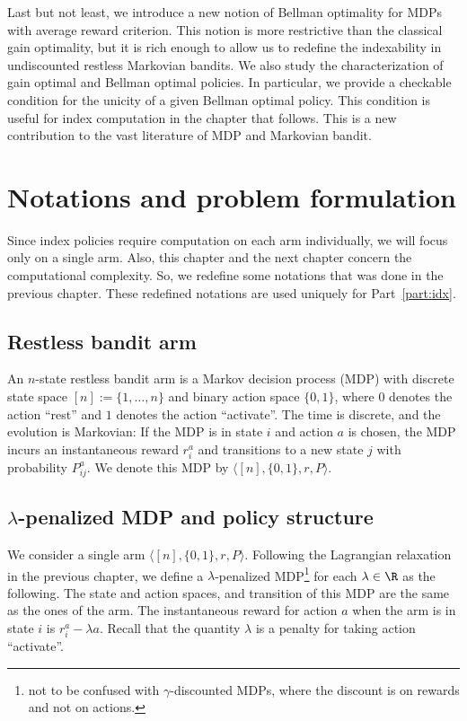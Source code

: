 Last but not least, we introduce a new notion of Bellman optimality for MDPs with average reward criterion. This notion is more restrictive than the classical gain optimality, but it is rich enough to allow us to redefine the indexability in undiscounted restless Markovian bandits. We also study the characterization of gain optimal and Bellman optimal policies. In particular, we provide a checkable condition for the unicity of a given Bellman optimal policy.
This condition is useful for index computation in the chapter that follows.
This is a new contribution to the vast literature of MDP and Markovian bandit.

\section{Notations and problem formulation}
\label{ch:idx:sec:notation}

Since index policies require computation on each arm individually, we will focus only on a single arm.
Also, this chapter and the next chapter concern the computational complexity.
So, we redefine some notations that was done in the previous chapter.
These redefined notations are used uniquely for Part~\ref{part:idx}.

\subsection{Restless bandit arm}

An $n$-state restless bandit arm is a Markov decision process (MDP) with discrete state space $[n]:=\{1,\dots, n\}$ and binary action space $\{0, 1\}$, where $0$ denotes the action ``rest'' and $1$ denotes the action ``activate''. The time is discrete, and the evolution is Markovian: If the MDP is in state $i$ and action $a$ is chosen, the MDP incurs an instantaneous reward ${r}^a_i$ and transitions to a new state $j$ with probability ${P}^a_{ij}$. We denote this MDP by $\langle[n],\{0,1\},r,P\rangle$.

\subsection{\texorpdfstring{$\lambda$-p}{P}enalized MDP and policy structure}
\label{ch:idx:sec:penal_mdp}

We consider a single arm $\langle[n],\{0,1\},r,P\rangle$.
Following the Lagrangian relaxation in the previous chapter, we define a $\lambda$-penalized MDP\footnote{not to be confused with $\gamma$-discounted MDPs, where the discount is on rewards and not on actions.} for each $\lambda\in\R$ as the following.
The state and action spaces, and transition of this MDP are the same as the ones of the arm.
The instantaneous reward for action $a$ when the arm is in state $i$ is $r^a_i-\lambda a$.
Recall that the quantity $\lambda$ is a penalty for taking action ``activate''.

